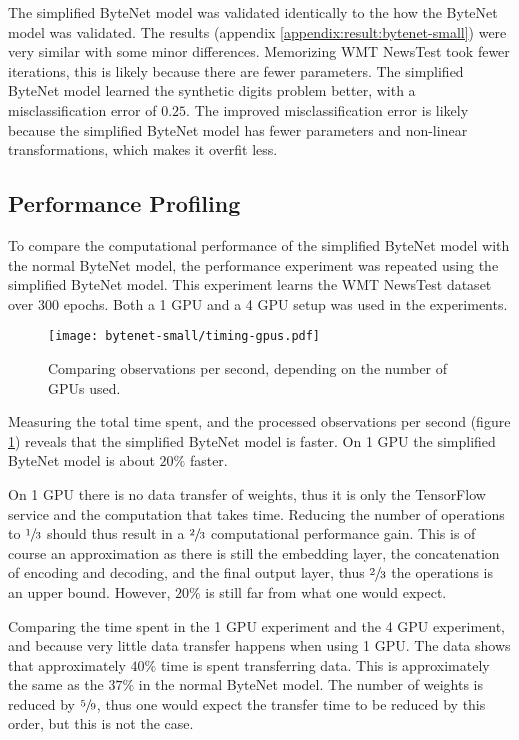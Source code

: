 The simplified ByteNet model was validated identically to the how the ByteNet model was validated. The results (appendix \ref{appendix:result:bytenet-small}) were very similar with some minor differences. Memorizing WMT NewsTest took fewer iterations, this is likely because there are fewer parameters. The simplified ByteNet model learned the synthetic digits problem better, with a misclassification error of $0.25$. The improved misclassification error is likely because the simplified ByteNet model has fewer parameters and non-linear transformations, which makes it overfit less.

\subsection{Performance Profiling}

To compare the computational performance of the simplified ByteNet model with the normal ByteNet model, the performance experiment was repeated using the simplified ByteNet model. This experiment learns the WMT NewsTest dataset over 300 epochs. Both a 1 GPU and a 4 GPU setup was used in the experiments.

\begin{figure}[h]
    \centering
    \texttt{[image: bytenet-small/timing-gpus.pdf]}
    \caption{Comparing observations per second, depending on the number of GPUs used.}
    \label{fig:result:simple-bytenet:timing-gpus}
\end{figure}

Measuring the total time spent, and the processed observations per second (figure \ref{fig:result:simple-bytenet:timing-gpus}) reveals that the simplified ByteNet model is faster. On 1 GPU the simplified ByteNet model is about $20\%$ faster.

On 1 GPU there is no data transfer of weights, thus it is only the TensorFlow service and the computation that takes time. Reducing the number of operations to $\sfrac{1}{3}$ should thus result in a $\sfrac{2}{3}$ computational performance gain. This is of course an approximation as there is still the embedding layer, the concatenation of encoding and decoding, and the final output layer, thus $\sfrac{2}{3}$ the operations is an upper bound. However, $20\%$ is still far from what one would expect.

Comparing the time spent in the 1 GPU experiment and the 4 GPU experiment, and because very little data transfer happens when using 1 GPU. The data shows that approximately $40\%$ time is spent transferring data. This is approximately the same as the $37\%$ in the normal ByteNet model. The number of weights is reduced by $\sfrac{5}{9}$, thus one would expect the transfer time to be reduced by this order, but this is not the case.

